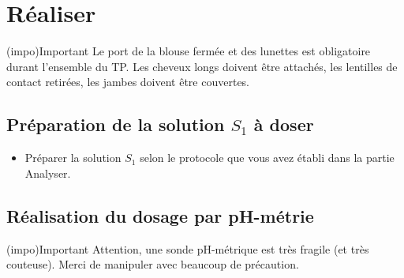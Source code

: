 \documentclass[../main/main.tex]{subfiles}
\begin{document}
\section{Réaliser}

\begin{tcb}(impo){Important}
	Le port de la blouse fermée et des lunettes est obligatoire durant
	l'ensemble du TP. Les cheveux longs doivent être attachés, les lentilles
	de contact retirées, les jambes doivent être couvertes.
\end{tcb}

\subsection{Préparation de la solution $S_1$ à doser}

\begin{itemize}[label=$\triangleright$]
	\item Préparer la solution $S_1$ selon le protocole que vous avez établi
	      dans la partie Analyser.
\end{itemize}

\subsection{Réalisation du dosage par pH-métrie}

\begin{tcb}(impo){Important}
	Attention, une sonde pH-métrique est très fragile (et très couteuse).
	Merci de manipuler avec beaucoup de précaution.
\end{tcb}

\end{document}
